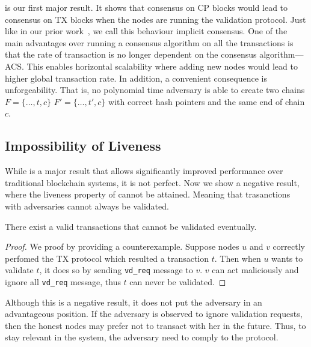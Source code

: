  is our first major result.
It shows that consensus on CP blocks would lead to consensus on TX blocks when the nodes are running the validation protocol.
Just like in our prior work~\cite{implicitconsensus}, we call this behaviour implicit consensus.
One of the main advantages over running a consensus algorithm on all the transactions is that 
the rate of transaction is no longer dependent on the consensus algorithm---ACS.
This enables horizontal scalability where adding new nodes would lead to higher global transaction rate.
In addition, a convenient consequence  is unforgeability.
That is, no polynomial time adversary is able to create two chains $F = \{ \dots, t, c\}$ $F' = \{ \dots, t', c\}$ with correct hash pointers and the same end of chain $c$.

\subsection{Impossibility of Liveness}
While  is a major result that allows significantly improved performance over traditional blockchain systems,
it is not perfect.
Now we show a negative result, where the liveness property of  cannot be attained.
Meaning that trasanctions with adversaries cannot always be validated.

\begin{lemma}
There exist a valid transactions that cannot be validated eventually.
\end{lemma}
\begin{proof}
We proof by providing a counterexample.
Suppose nodes $u$ and $v$ correctly perfomed the TX protocol which resulted a transaction $t$.
Then when $u$ wants to validate $t$, it does so by sending \texttt{vd\_req} message to $v$.
$v$ can act maliciously and ignore all \texttt{vd\_req} message, thus $t$ can never be validated.
\end{proof}
Although this is a negative result, it does not put the adversary in an advantageous position.
If the adversary is observed to ignore validation requests, then the honest nodes may prefer not to transact with her in the future.
Thus, to stay relevant in the system, the adversary need to comply to the protocol.


